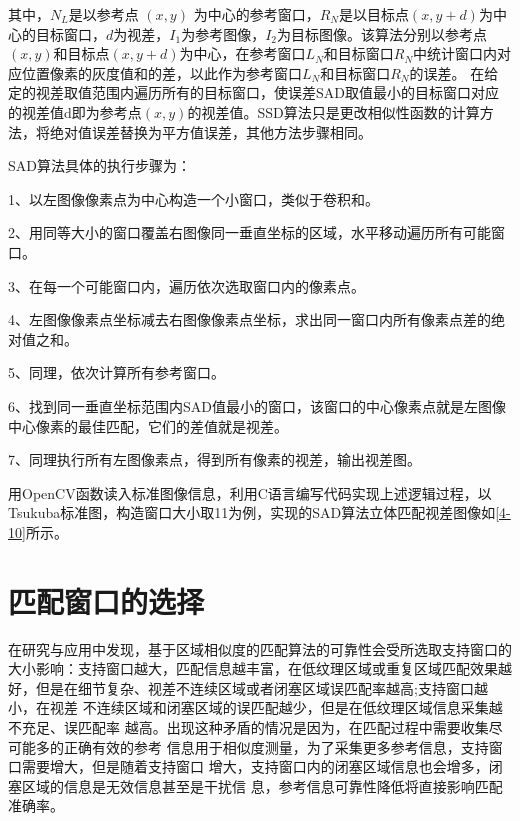 其中，$N_{L}$是以参考点 $(x,y)$ 为中心的参考窗口，$R_{N}$是以目标点$(x,y+d)$为中心的目标窗口，$d$为视差，$I_{1}$为参考图像，$I_{2}$为目标图像。该算法分别以参考点$(x,y)$和目标点$(x,y+d)$为中心，在参考窗口$L_{N}$和目标窗口$R_{N}$中统计窗口内对应位置像素的灰度值和的差，以此作为参考窗口$L_{N}$和目标窗口$R_{N}$的误差。
在给定的视差取值范围内遍历所有的目标窗口，使误差SAD取值最小的目标窗口对应的视差值d即为参考点$(x,y)$的视差值。SSD算法只是更改相似性函数的计算方法，将绝对值误差替换为平方值误差，其他方法步骤相同。


SAD算法具体的执行步骤为：

1、以左图像像素点为中心构造一个小窗口，类似于卷积和。

2、用同等大小的窗口覆盖右图像同一垂直坐标的区域，水平移动遍历所有可能窗口。

3、在每一个可能窗口内，遍历依次选取窗口内的像素点。 

4、左图像像素点坐标减去右图像像素点坐标，求出同一窗口内所有像素点差的绝对值之和。

5、同理，依次计算所有参考窗口。

6、找到同一垂直坐标范围内SAD值最小的窗口，该窗口的中心像素点就是左图像中心像素的最佳匹配，它们的差值就是视差。

7、同理执行所有左图像素点，得到所有像素的视差，输出视差图。

用OpenCV函数读入标准图像信息，利用C语言编写代码实现上述逻辑过程，以Tsukuba标准图，构造窗口大小取11为例，实现的SAD算法立体匹配视差图像如\ref{4-10}所示。


\section{匹配窗口的选择}

在研究与应用中发现，基于区域相似度的匹配算法的可靠性会受所选取支持窗口的大小影响：支持窗口越大，匹配信息越丰富，在低纹理区域或重复区域匹配效果越好，但是在细节复杂、视差不连续区域或者闭塞区域误匹配率越高;支持窗口越小，在视差
不连续区域和闭塞区域的误匹配越少，但是在低纹理区域信息采集越不充足、误匹配率
越高。出现这种矛盾的情况是因为，在匹配过程中需要收集尽可能多的正确有效的参考
信息用于相似度测量，为了采集更多参考信息，支持窗口需要增大，但是随着支持窗口
增大，支持窗口内的闭塞区域信息也会增多，闭塞区域的信息是无效信息甚至是干扰信
息，参考信息可靠性降低将直接影响匹配准确率。

